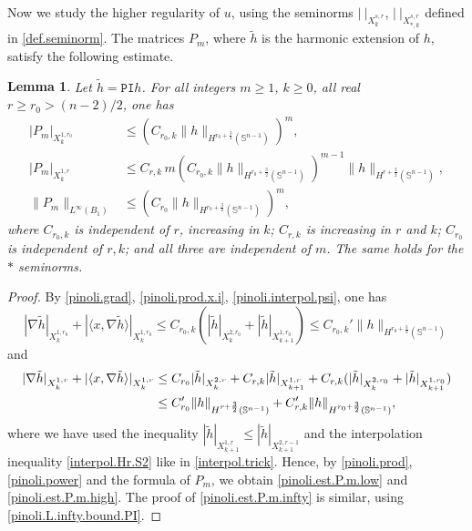 \documentclass[10pt,reqno,a4paper]{article}
\numberwithin{equation}{section}
\theoremstyle{plain}
\newtheorem{lemma}[theorem]{Lemma}
\theoremstyle{definition}
\renewcommand{\S}{{\mathbb S}}
\newcommand{\la}{\langle}
\newcommand{\ra}{\rangle}
\newcommand{\grad}{\nabla}
\begin{document}
Now we study the higher regularity of $u$, 
using the seminorms $| \ |_{X^{s,r}_k}$, $| \ |_{X^{s,r}_{*,k}}$ defined in \eqref{def.seminorm}. 
The matrices $P_m$, where $\tilde h$ is the harmonic extension of $h$, 
satisfy the following estimate. 

\begin{lemma}
Let $\tilde h = \mathtt{PI} h$. 
For all integers $m \geq 1$, $k \geq 0$, all real $r \geq r_0 > (n-2)/2$, 
one has 
\begin{align} 
|P_m|_{X^{1,r_0}_k} 
& \leq (C_{r_0,k} \| h \|_{H^{r_0+\frac32}(\S^{n-1})} )^m,
\label{pinoli.est.P.m.low}
\\
|P_m|_{X^{1,r}_k} 
& \leq C_{r,k} \, m ( C_{r_0,k} \| h \|_{H^{r_0+\frac32}(\S^{n-1})} )^{m-1} 
\| h \|_{H^{r+\frac32}(\S^{n-1})},
\label{pinoli.est.P.m.high}
\\
\| P_m \|_{L^\infty(B_1)} 
& \leq (C_{r_0} \| h \|_{H^{r_0+\frac32}(\S^{n-1})} )^m, 
\label{pinoli.est.P.m.infty}
\end{align}
where 
$C_{r_0,k}$ is independent of $r$, increasing in $k$;
$C_{r,k}$ is increasing in $r$ and $k$; 
$C_{r_0}$ is independent of $r,k$; 
and all three are independent of $m$. 
The same holds for the $*$ seminorms. 
\end{lemma}

\begin{proof} 
By \eqref{pinoli.grad}, 
\eqref{pinoli.prod.x.i}, 
\eqref{pinoli.interpol.psi},
one has 
\begin{equation} \label{benef.2}
|\grad \tilde h|_{X^{1,r_0}_k} + |\la x , \grad \tilde h \ra|_{X^{1,r_0}_k} 
\leq C_{r_0,k} (|\tilde h|_{X^{2,r_0}_k} + |\tilde h|_{X^{1,r_0}_{k+1}})
\leq C_{r_0,k}' \| h \|_{H^{r_0+\frac32}(\S^{n-1})}
\end{equation}
and 
\begin{align}
|\grad \tilde h|_{X^{1,r}_k} + |\la x , \grad \tilde h \ra|_{X^{1,r}_k} 
& \leq C_{r_0} |\tilde h|_{X^{2,r}_k} + C_{r,k} |\tilde h|_{X^{1,r}_{k+1}}
+ C_{r,k} (|\tilde h|_{X^{2,r_0}_k} + |\tilde h|_{X^{1,r_0}_{k+1}})
\notag \\ 
& \leq C_{r_0}' \| h \|_{H^{r+\frac32}(\S^{n-1})} 
+ C_{r,k}' \| h \|_{H^{r_0+\frac32}(\S^{n-1})},
\label{benef.3}
\end{align}
where we have used the inequality $|\tilde h|_{X^{1,r}_{k+1}} \leq |\tilde h|_{X^{2,r-1}_{k+1}}$
and the interpolation inequality \eqref{interpol.Hr.S2} like in \eqref{interpol.trick}.
Hence, by \eqref{pinoli.prod}, \eqref{pinoli.power} 
and the formula of $P_m$, we obtain 
\eqref{pinoli.est.P.m.low} and \eqref{pinoli.est.P.m.high}. 
The proof of \eqref{pinoli.est.P.m.infty} is similar, using \eqref{pinoli.L.infty.bound.PI}.
\end{proof}
\end{document}
